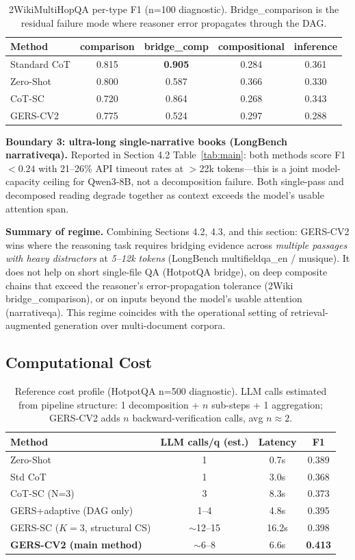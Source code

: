 \documentclass[11pt,a4paper]{article}
\begin{document}
\begin{table}[h]
\centering
\caption{2WikiMultiHopQA per-type F1 (n=100 diagnostic). Bridge\_comparison is the residual failure mode where reasoner error propagates through the DAG.}
\begin{tabular}{lcccc}
\toprule
Method & comparison & bridge\_comp & compositional & inference \\
\midrule
Standard CoT & 0.815 & \textbf{0.905} & 0.284 & 0.361 \\
Zero-Shot & 0.800 & 0.587 & 0.366 & 0.330 \\
CoT-SC & 0.720 & 0.864 & 0.268 & 0.343 \\
GERS-CV2 & 0.775 & 0.524 & 0.297 & 0.288 \\
\bottomrule
\end{tabular}
\end{table}

\textbf{Boundary 3: ultra-long single-narrative books (LongBench narrativeqa).} Reported in Section 4.2 Table~\ref{tab:main}: both methods score F1 ${<}0.24$ with 21--26\% API timeout rates at ${>}$22k tokens---this is a joint model-capacity ceiling for Qwen3-8B, not a decomposition failure. Both single-pass and decomposed reading degrade together as context exceeds the model's usable attention span.

\textbf{Summary of regime.} Combining Sections 4.2, 4.3, and this section: GERS-CV2 wins where the reasoning task requires bridging evidence across \emph{multiple passages with heavy distractors} at \emph{5--12k tokens} (LongBench multifieldqa\_en / musique). It does not help on short single-file QA (HotpotQA bridge), on deep composite chains that exceed the reasoner's error-propagation tolerance (2Wiki bridge\_comparison), or on inputs beyond the model's usable attention (narrativeqa). This regime coincides with the operational setting of retrieval-augmented generation over multi-document corpora.

\subsection{Computational Cost}

\begin{table}[h]
\centering
\caption{Reference cost profile (HotpotQA n=500 diagnostic). LLM calls estimated from pipeline structure: 1 decomposition + $n$ sub-steps + 1 aggregation; GERS-CV2 adds $n$ backward-verification calls, avg $n\approx2$.}
\begin{tabular}{lccc}
\toprule
Method & LLM calls/q (est.) & Latency & F1 \\
\midrule
Zero-Shot & 1 & 0.7s & 0.389 \\
Std CoT & 1 & 3.0s & 0.368 \\
CoT-SC (N=3) & 3 & 8.3s & 0.373 \\
GERS+adaptive (DAG only) & 1--4 & 4.8s & 0.395 \\
GERS-SC ($K=3$, structural CS) & $\sim$12--15 & 16.2s & 0.398 \\
\textbf{GERS-CV2 (main method)} & $\sim$6--8 & 6.6s & \textbf{0.413} \\
\bottomrule
\end{tabular}
\end{table}
\end{document}
